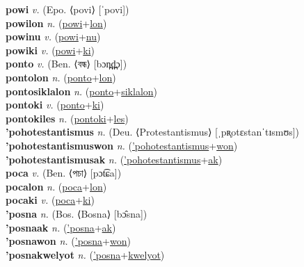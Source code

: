 \textbf{powi} \textit{v.} (Epo. ⟨povi⟩ [ˈpovi])
 \label{powi} \\
\textbf{powilon} \textit{n.} (\hyperref[powi]{powi}+\hyperref[lon]{lon})
 \label{powilon} \\
\textbf{powinu} \textit{v.} (\hyperref[powi]{powi}+\hyperref[nu]{nu})
 \label{powinu} \\
\textbf{powiki} \textit{v.} (\hyperref[powi]{powi}+\hyperref[ki]{ki})
 \label{powiki} \\
\textbf{ponto} \textit{v.} (Ben. ⟨বন্ধ⟩ [bɔn̪d̪̤ɔ])
 \label{ponto} \\
\textbf{pontolon} \textit{n.} (\hyperref[ponto]{ponto}+\hyperref[lon]{lon})
 \label{pontolon} \\
\textbf{pontosiklalon} \textit{n.} (\hyperref[ponto]{ponto}+\hyperref[siklalon]{siklalon})
 \label{pontosiklalon} \\
\textbf{pontoki} \textit{v.} (\hyperref[ponto]{ponto}+\hyperref[ki]{ki})
 \label{pontoki} \\
\textbf{pontokiles} \textit{n.} (\hyperref[pontoki]{pontoki}+\hyperref[les]{les})
 \label{pontokiles} \\
\textbf{'pohotestantismus} \textit{n.} (Deu. ⟨Protestantismus⟩ [ˌpʀ̥otɛstanˈtɪsmʊs])
 \label{'pohotestantismus} \\
\textbf{'pohotestantismuswon} \textit{n.} (\hyperref['pohotestantismus]{'pohotestantismus}+\hyperref[won]{won})
 \label{'pohotestantismuswon} \\
\textbf{'pohotestantismusak} \textit{n.} (\hyperref['pohotestantismus]{'pohotestantismus}+\hyperref[ak]{ak})
 \label{'pohotestantismusak} \\
\textbf{poca} \textit{v.} (Ben. ⟨পচা⟩ [pɔt͡ɕa])
 \label{poca} \\
\textbf{pocalon} \textit{n.} (\hyperref[poca]{poca}+\hyperref[lon]{lon})
 \label{pocalon} \\
\textbf{pocaki} \textit{v.} (\hyperref[poca]{poca}+\hyperref[ki]{ki})
 \label{pocaki} \\
\textbf{'posna} \textit{n.} (Bos. ⟨Bosna⟩ [bɔ̂sna])
 \label{'posna} \\
\textbf{'posnaak} \textit{n.} (\hyperref['posna]{'posna}+\hyperref[ak]{ak})
 \label{'posnaak} \\
\textbf{'posnawon} \textit{n.} (\hyperref['posna]{'posna}+\hyperref[won]{won})
 \label{'posnawon} \\
\textbf{'posnakwelyot} \textit{n.} (\hyperref['posna]{'posna}+\hyperref[kwelyot]{kwelyot})
 \label{'posnakwelyot} \\

